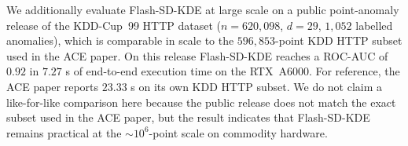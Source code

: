 We additionally evaluate Flash-SD-KDE at large scale on a public point-anomaly
release of the KDD-Cup~99 HTTP dataset ($n=620{,}098$, $d=29$, $1{,}052$
labelled anomalies), which is comparable in scale to the
$596{,}853$-point KDD HTTP subset used in the ACE paper.
On this release Flash-SD-KDE reaches a ROC-AUC of $0.92$ in $7.27$ s of
end-to-end execution time on the RTX~A6000.
For reference, the ACE paper reports $23.33$ s on its own KDD HTTP subset.
We do not claim a like-for-like comparison here because the public release
does not match the exact subset used in the ACE paper, but the result
indicates that Flash-SD-KDE remains practical at the $\sim\!10^6$-point
scale on commodity hardware.
